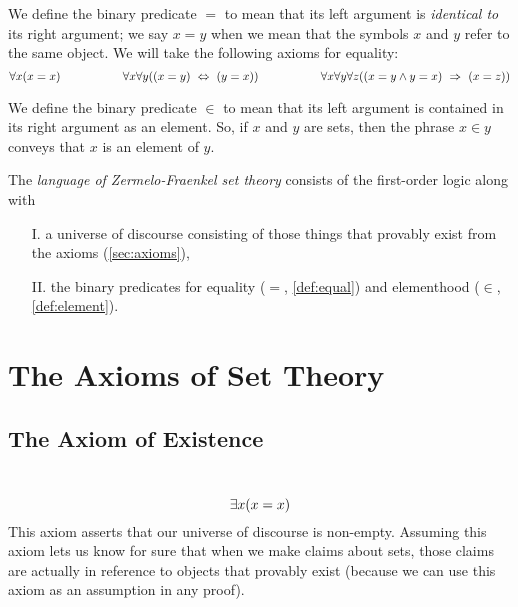 \begin{definition}[Equality]\label{def:equal}
    We define the binary predicate $=$ to mean that
    its left argument is \emph{identical to} its right argument;
    \ie we say $x = y$
    when we mean that the symbols $x$ and $y$ refer to the same object.
    We will take the following axioms for equality:
    \[
        \forall x \pn*{x = x}
        ~~~~~~~~~~~~~~~~
        \forall x \forall y \pn*{\pn*{x = y} \iff \pn*{y = x}}
        ~~~~~~~~~~~~~~~~
        \forall x \forall y \forall z \pn*{\pn*{x = y \meet y = x} \implies \pn*{x = z}}
    \]
\end{definition}

\begin{definition}[Elementhood]\label{def:element}
    We define the binary predicate $\in$ to mean that its left argument is
    contained in its right argument as an element.
    So, if $x$ and $y$ are sets, then the phrase $x \in y$
    conveys that $x$ is an element of $y$.
\end{definition}

\begin{definition}
    The \emph{language of Zermelo-Fraenkel set theory}
    consists of the first-order logic
    along with
    \begin{enumerate}
        \item[I.]
            a universe of discourse consisting of
            those things that provably exist from the axioms (\autoref{sec:axioms}),
        \item[II.]
            the binary predicates for equality ($=$, \autoref{def:equal})
            and elementhood ($\in$, \autoref{def:element}).
    \end{enumerate}
\end{definition}

\section{The Axioms of Set Theory}\label{sec:axioms}
\setcounter{axiom}{-1}

\subsection{The Axiom of Existence}
\begin{axiom}[Existence]\label{ax:existence}
    ~\vspace{-\baselineskip}
    \[
        \exists x \pn*{x = x}
    \]
    This axiom asserts that our universe of discourse is non-empty.
    Assuming this axiom lets us know for sure that when we make claims about sets,
    those claims are actually in reference to objects that provably exist
    (because we can use this axiom as an assumption in any proof).
\end{axiom}

